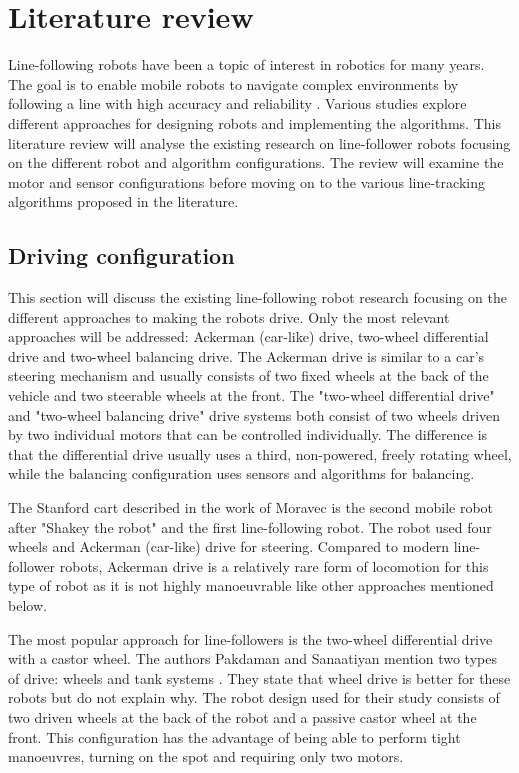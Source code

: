 \section{Literature review} \label{sec:litrev}

Line-following robots have been a topic of interest in robotics for many years. The goal is to enable mobile robots to navigate complex environments by following a line with high accuracy and reliability \cite{pakdaman}. Various studies explore different approaches for designing robots and implementing the algorithms. This literature review will analyse the existing research on line-follower robots focusing on the different robot and algorithm configurations. The review will examine the motor and sensor configurations before moving on to the various line-tracking algorithms proposed in the literature.

\subsection{Driving configuration}

This section will discuss the existing line-following robot research focusing on the different approaches to making the robots drive. Only the most relevant approaches will be addressed: Ackerman (car-like) drive, two-wheel differential drive and two-wheel balancing drive. The Ackerman drive is similar to a car's steering mechanism and usually  consists of two fixed wheels at the back of the vehicle and two steerable wheels at the front. The "two-wheel differential drive" and "two-wheel balancing drive" drive systems both consist of two wheels driven by two individual motors that can be controlled individually. The difference is that the differential drive usually uses a third, non-powered, freely rotating wheel, while the balancing configuration uses sensors and algorithms for balancing.

The Stanford cart described in the work of Moravec \cite{moravec} is the second mobile robot after "Shakey the robot" \cite{shakey} and the first line-following robot. The robot used four wheels and Ackerman (car-like) drive for steering. Compared to modern line-follower robots, Ackerman drive is a relatively rare form of locomotion for this type of robot as it is not highly manoeuvrable like other approaches mentioned below.

The most popular approach for line-followers is the two-wheel differential drive with a castor wheel. The authors Pakdaman and Sanaatiyan mention two types of drive: wheels and tank systems \cite{pakdaman}. They state that wheel drive is better for these robots but do not explain why. The robot design used for their study consists of two driven wheels at the back of the robot and a passive castor wheel at the front. This configuration has the advantage of being able to perform tight manoeuvres, turning on the spot and requiring only two motors.

